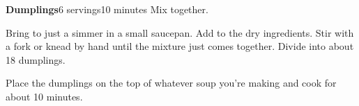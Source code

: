 \documentclass[../Cookbook.tex]{subfiles}
\begin{document}
\begin{recipe}[Dumplings]{\textbf{Dumplings}}{6 servings}{10 minutes}
    Mix together.

    Bring to just a simmer in a small saucepan.
    Add to the dry ingredients.
    Stir with a fork or knead by hand until the mixture just comes together.
    Divide into about 18 dumplings.

    Place the dumplings on the top of whatever soup you're making and cook for about 10 minutes.
\end{recipe}
\end{document}
